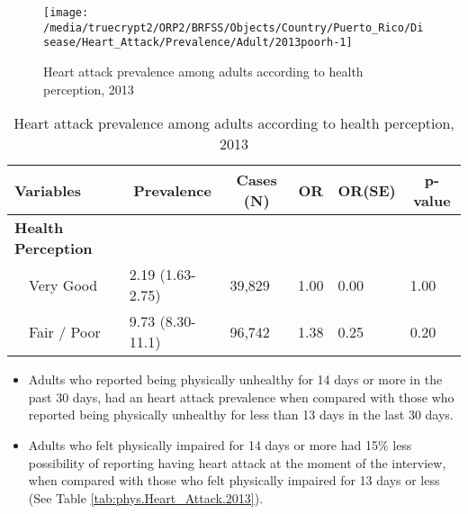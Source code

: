 \begin{figure}[H]
\caption{Heart attack prevalence among adults according to health perception,
         2013}
\label{fig:fairpoor.Heart_Attack.2013}

\begin{knitrout}
\color{fgcolor}

{\centering \texttt{[image: /media/truecrypt2/ORP2/BRFSS/Objects/Country/Puerto\_Rico/Disease/Heart\_Attack/Prevalence/Adult/2013poorh-1]} 

}



\end{knitrout}
 \end{figure}

\begin{table}[H]
\caption{Heart attack prevalence  among adults according to health perception, 2013\label{tab:fairpoor.Heart_Attack.2013}} 
\begin{center}
\begin{tabular}{llllll}
\hline\hline
\multicolumn{1}{l}{Variables}&\multicolumn{1}{c}{Prevalence}&\multicolumn{1}{c}{Cases (N)}&\multicolumn{1}{c}{OR}&\multicolumn{1}{c}{OR(SE)}&\multicolumn{1}{c}{p-value}\tabularnewline
\hline
{\bfseries Health Perception}&&&&&\tabularnewline
~~Very Good&2.19 (1.63-2.75)&39,829&1.00&0.00&1.00\tabularnewline
~~Fair / Poor&9.73 (8.30-11.1)&96,742&1.38&0.25&0.20\tabularnewline
\hline
\end{tabular}\end{center}

\end{table}

 
\newpage

 \newpage
\begin{itemize}

\item Adults who reported being physically unhealthy for 14 days or more in the past 30 days, had an  
 heart attack prevalence when compared with 
those who reported being physically unhealthy for less than 13 days in the last 30 days.


\item Adults who felt physically impaired for 14 days or more had 15\% less possibility of reporting having heart attack at the moment of the interview, when compared with those who felt physically impaired for 13 days or less (See Table \ref{tab:phys.Heart_Attack.2013}).

\end{itemize}


